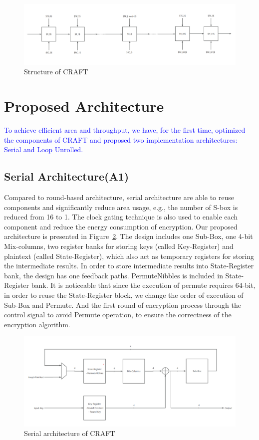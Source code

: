 \documentclass[sn-basic]{sn-jnl}%
\begin{document}
\begin{figure}[h]%
    \centering
    \includegraphics[width=\textwidth]{struct_of_craft.png}   
    \caption{Structure of CRAFT}\label{fig1}
\end{figure}


\section{Proposed Architecture}\label{sec3}

\textcolor{blue}{To achieve efficient area and throughput, we have, for the first time, optimized the components of CRAFT and proposed two implementation architectures: Serial and Loop Unrolled.}


\subsection{Serial Architecture(A1)}\label{subsec2}
Compared to round-based architecture, serial architecture are able to reuse components and significantly reduce area usage, e.g., the number of S-box is reduced from 16 to 1.
The clock gating technique is also used to enable each component and reduce the energy consumption of encryption. Our proposed architecture is presented in Figure~\ref{fig3}.
The design includes one Sub-Box, one 4-bit Mix-columns, two register banks for storing keys (called Key-Register) and plaintext (called State-Register), which also act as temporary registers for storing the intermediate results.
In order to store intermediate results into State-Register bank, the design has one feedback paths.
PermuteNibbles is included in State-Register bank.
It is noticeable that since the execution of permute requires 64-bit, in order to reuse the State-Register block, we change the order of execution of Sub-Box and Permute.
And the first round of encryption process through the control signal to avoid Permute operation, to ensure the correctness of the encryption algorithm.

\begin{figure}[h]%
    \centering
    \includegraphics[width=\textwidth]{serial_design.png}
    \caption{Serial architecture of CRAFT}\label{fig3}
\end{figure}
\end{document}
